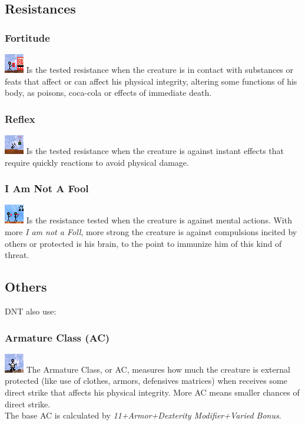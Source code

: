 \documentclass[ letterpaper,12pt]{article}
\begin{document}
\subsection{Resistances}

\subsubsection{Fortitude}
\includegraphics{../data/skills/Img/fortitude.png}
Is the tested resistance when the creature is in contact with substances or
feats that affect or can affect his physical integrity, altering some
functions of his body, as poisons, coca-cola or effects of immediate death.

\subsubsection{Reflex}
\includegraphics{../data/skills/Img/reflexos.png}
Is the tested resistance when the creature is against instant effects that
require quickly reactions to avoid physical damage.

\subsubsection{I Am Not A Fool}
\includegraphics{../data/skills/Img/vontade.png}
Is the resistance tested when the creature is against mental actions. With more
{\it I am not a Foll}, more strong the creature is against compulsions incited
by others or protected is his brain, to the point to immunize him of this kind
of threat.

\subsection{Others}
DNT also use:

\subsubsection{Armature Class (AC)}
\includegraphics{../data/skills/Img/ca.png}
The Armature Class, or AC, measures how much the creature is external protected
(like use of clothes, armors, defensives matrices) when receives some direct
strike that affects his physical integrity. More AC means smaller chances of
direct strike.\\
The base AC is calculated by {\it 11+Armor+Dexterity Modifier+Varied Bonus}.
\end{document}
